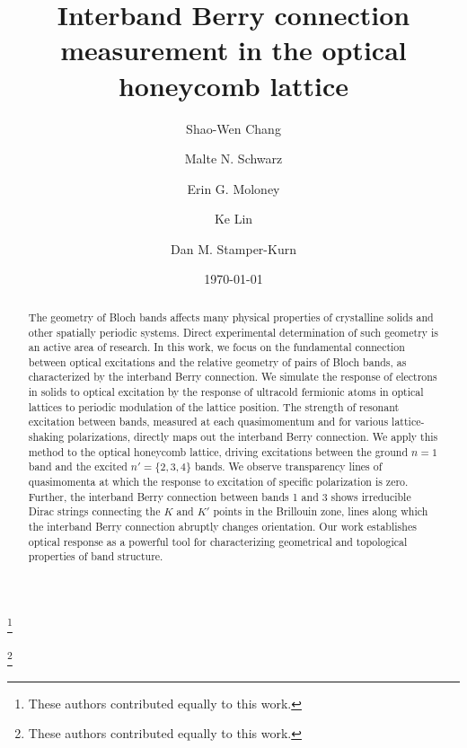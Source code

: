 \documentclass[superscriptaddress, reprint, amsmath, amssymb, aps, prl]{revtex4-2}
\begin{document}
\title{Interband Berry connection measurement in the optical honeycomb lattice}

\author{Shao-Wen Chang}
 \thanks{These authors contributed equally to this work.}

\author{Malte N. Schwarz}%
 \thanks{These authors contributed equally to this work.}
 
\author{Erin G. Moloney}%
 
\author{Ke Lin}%
 
\author{Dan M. Stamper-Kurn}%

\date{\today}
\begin{abstract}
    The geometry of Bloch bands affects many physical properties of crystalline solids and other spatially periodic systems.  Direct experimental determination of such geometry is an active area of research.  In this work, we focus on the fundamental connection between optical excitations and the relative geometry of pairs of Bloch bands, as characterized by the interband Berry connection.  We simulate the response of electrons in solids to optical excitation by the response of ultracold fermionic atoms in optical lattices to periodic modulation of the lattice position.  The strength of resonant excitation between bands, measured at each quasimomentum and for various lattice-shaking polarizations, directly maps out the interband Berry connection.  We apply this method to the optical honeycomb lattice, driving excitations between the ground $n=1$ band and the excited $n'=\{2,3,4\}$ bands.  We observe transparency lines of quasimomenta at which the response to excitation of specific polarization is zero.  Further, the interband Berry connection between bands 1 and 3 shows irreducible Dirac strings connecting the $K$ and $K'$ points in the Brillouin zone, lines along which the interband Berry connection abruptly changes orientation.   Our work establishes optical response as a powerful tool for characterizing geometrical and topological properties of band structure.
\end{abstract}
\end{document}

